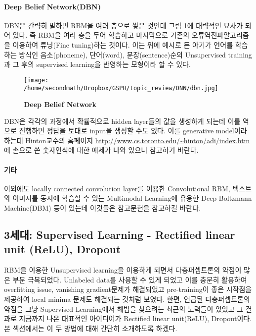 \documentclass[10pt]{article}
\begin{document}
\paragraph{Deep Belief Network(DBN)}
DBN은 간략히 말하면 RBM을 여러 층으로 쌓은 것인데 그림 \ref{dbn}에 대략적인 묘사가 되어 있다. 즉 RBM을 여러 층을 두어 학습하고 마지막으로 기존의 오류역전파알고리즘을 이용하여 튜닝(Fine tuning)하는 것이다\cite{hinton2006fast,hinton2009deep,bengio2009learning}. 이는 위에 예시로 든 아기가 언어를 학습하는 방식인 음소(phoneme),  단어(word), 문장(sentence)순의 Unsupervised training과 그 후의 supervised learning을 반영하는 모형이라 할 수 있다. 

\begin{figure}[!ht]
\centering
\texttt{[image: /home/secondmath/Dropbox/GSPH/topic\_review/DNN/dbn.jpg]}
\caption{\bf{Deep Belief Network\cite{dbnfig}}}
\label{dbn}
\end{figure}

DBN은 각각의 과정에서 확률적으로 hidden layer들의 값을 생성하게 되는데 이를 역으로 진행하면 정답을 토대로 input을 생성할 수도 있다. 이를 generative model이라 하는데 Hinton교수의 홈페이지 \url{http://www.cs.toronto.edu/~hinton/adi/index.htm}에 손으로 쓴 숫자인식에 대한 예제가 나와 있으니 참고하기 바란다. 

\paragraph{기타}
이외에도 locally connected convolution layer를 이용한 Convolutional RBM, 텍스트와 이미지를 동시에 학습할 수 있는 Multimodal Learning에 유용한 Deep Boltzmann Machine(DBM) 등이 있는데 이것들은 참고문헌을 참고하길 바란다\cite{lee2009convolutional,salakhutdinov2009deep}. 

\subsection{3세대: Supervised Learning - Rectified linear unit (ReLU), Dropout} 
RBM을 이용한 Unsupervised learning을 이용하게 되면서 다층퍼셉트론의 약점이 많은 부분 극복되었다. Unlabeled data를 사용할 수 있게 되었고 이를 충분히 활용하여 overfitting issue, vanishing gradient문제가 해결되었고 pre-training이 좋은 시작점을 제공하여 local minima 문제도 해결되는 것처럼 보였다. 한편, 언급된 다층퍼셉트론의 약점을 그냥 Supervised Learning에서 해법을 찾으려는 최근의 노력들이 있었고 그 결과로 지금까지 나온 대표적인 아이디어가 Rectified linear unit(ReLU), Dropout이다. 본 섹션에서는 이 두 방법에 대해 간단히 소개하도록 하겠다. 
\end{document}
